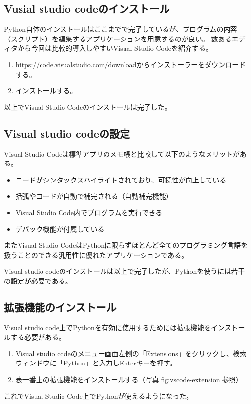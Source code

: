 \documentclass[]{ltjsarticle}
\begin{document}
	\subsection{Vusial studio codeのインストール}
	Python自体のインストールはここまでで完了しているが、プログラムの内容（スクリプト）を編集するアプリケーションを用意するのが良い。
	数あるエディタから今回は比較的導入しやすいVisual Studio Codeを紹介する。

	\begin{enumerate}
		\item \url{https://code.visualstudio.com/download}からインストーラーをダウンロードする。
		\item インストールする。
	\end{enumerate}
	以上でVisual Studio Codeのインストールは完了した。

	\subsection{Visual studio codeの設定}
	Visual Studio Codeは標準アプリのメモ帳と比較して以下のようなメリットがある。
	\begin{itemize}
		\item コードがシンタックスハイライトされており、可読性が向上している
		\item 括弧やコードが自動で補完される（自動補完機能）
		\item Visual Studio Code内でプログラムを実行できる
		\item デバック機能が付属している
	\end{itemize}
	またVisual Studio CodeはPythonに限らずほとんど全てのプログラミング言語を扱うことのできる汎用性に優れたアプリケーションである。

	Visual studio codeのインストールは以上で完了したが、Pythonを使うには若干の設定が必要である。

	\subsection{拡張機能のインストール}
	Visual studio code上でPythonを有効に使用するためには拡張機能をインストールする必要がある。
	\begin{enumerate}
		\item Visual studio codeのメニュー画面左側の「Extensions」をクリックし、検索ウィンドウに「Python」と入力しEnterキーを押す。
		\item 表一番上の拡張機能をインストールする（写真\ref{fig:vscode-extension}参照）
	\end{enumerate}
	これでVisual Studio Code上でPythonが使えるようになった。
\end{document}
